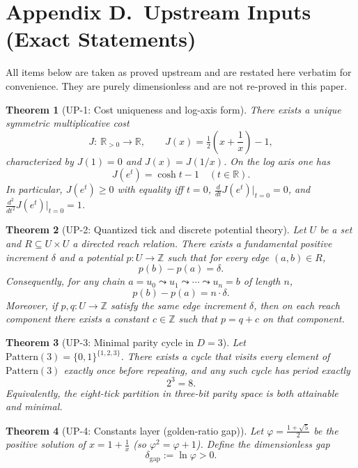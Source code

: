 \documentclass[11pt]{article}
\theoremstyle{plain}
\newtheorem{theorem}{Theorem}
\theoremstyle{definition}
\theoremstyle{remark}
\begin{document}
\section*{Appendix D.\ Upstream Inputs (Exact Statements)}

All items below are taken as proved upstream and are restated here verbatim for convenience. They are purely dimensionless and are not re-proved in this paper.

\begin{theorem}[UP-1: Cost uniqueness and log-axis form]
There exists a unique symmetric multiplicative cost
\[
J:\ \mathbb{R}_{>0}\to\mathbb{R},\qquad
J(x)=\tfrac12\!\left(x+\frac{1}{x}\right)-1,
\]
characterized by \(J(1)=0\) and \(J(x)=J(1/x)\). On the log axis one has
\[
J(e^{t})=\cosh t-1\quad(t\in\mathbb{R}).
\]
In particular, \(J(e^{t})\ge 0\) with equality iff \(t=0\), \(\frac{d}{dt}J(e^{t})\big|_{t=0}=0\), and \(\frac{d^{2}}{dt^{2}}J(e^{t})\big|_{t=0}=1\).
\end{theorem}

\begin{theorem}[UP-2: Quantized tick and discrete potential theory]
Let \(U\) be a set and \(R\subseteq U\times U\) a directed reach relation. There exists a fundamental positive increment \(\delta\) and a potential \(p:U\to\mathbb{Z}\) such that for every edge \((a,b)\in R\),
\[
p(b)-p(a)=\delta.
\]
Consequently, for any chain \(a=u_{0}\leadsto u_{1}\leadsto\cdots\leadsto u_{n}=b\) of length \(n\),
\[
p(b)-p(a)=n\cdot\delta.
\]
Moreover, if \(p,q:U\to\mathbb{Z}\) satisfy the same edge increment \(\delta\), then on each reach component there exists a constant \(c\in\mathbb{Z}\) such that \(p=q+c\) on that component.
\end{theorem}

\begin{theorem}[UP-3: Minimal parity cycle in \(D=3\)]
Let \(\mathrm{Pattern}(3)=\{0,1\}^{\{1,2,3\}}\). There exists a cycle that visits every element of \(\mathrm{Pattern}(3)\) exactly once before repeating, and any such cycle has period exactly
\[
2^{3}=8.
\]
Equivalently, the eight-tick partition in three-bit parity space is both attainable and minimal.
\end{theorem}

\begin{theorem}[UP-4: Constants layer (golden-ratio gap)]
Let \(\varphi=\tfrac{1+\sqrt{5}}{2}\) be the positive solution of \(x=1+\tfrac{1}{x}\) (so \(\varphi^{2}=\varphi+1\)). Define the dimensionless gap
\[
\delta_{\mathrm{gap}}:=\ln\varphi>0.
\]
\end{theorem}
\end{document}
